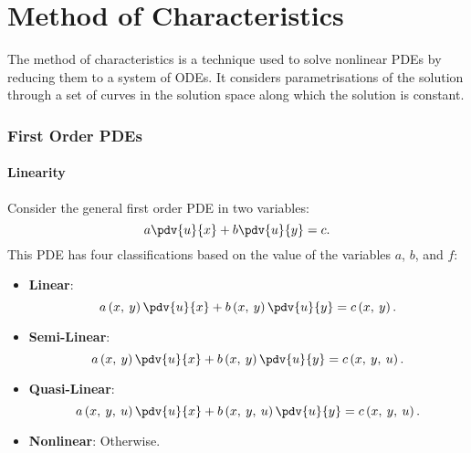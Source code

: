 \documentclass{article}
\theoremstyle{definition}
\begin{document}
\part{Method of Characteristics}
The method of characteristics is a technique used to solve nonlinear
PDEs by reducing them to a system of ODEs. It considers
parametrisations of the solution through a set of curves in the
solution space along which the solution is constant.
\section{First Order PDEs}
\subsection{Linearity}
Consider the general first order PDE in two variables:
\begin{equation*}
    a \pdv{u}{x} + b \pdv{u}{y} = c.
\end{equation*}
This PDE has four classifications based on the value of the
variables \(a\), \(b\), and \(f\):
\begin{itemize}
    \item \textbf{Linear}:
          \begin{equation*}
              a\left( x,\: y \right) \pdv{u}{x} + b\left( x,\: y \right) \pdv{u}{y} = c\left( x,\: y \right).
          \end{equation*}
    \item \textbf{Semi-Linear}:
          \begin{equation*}
              a\left( x,\: y \right) \pdv{u}{x} + b\left( x,\: y \right) \pdv{u}{y} = c\left( x,\: y,\: u \right).
          \end{equation*}
    \item \textbf{Quasi-Linear}:
          \begin{equation*}
              a\left( x,\: y,\: u \right) \pdv{u}{x} + b\left( x,\: y,\: u \right) \pdv{u}{y} = c\left( x,\: y,\: u \right).
          \end{equation*}
    \item \textbf{Nonlinear}: Otherwise.
\end{itemize}
\end{document}
